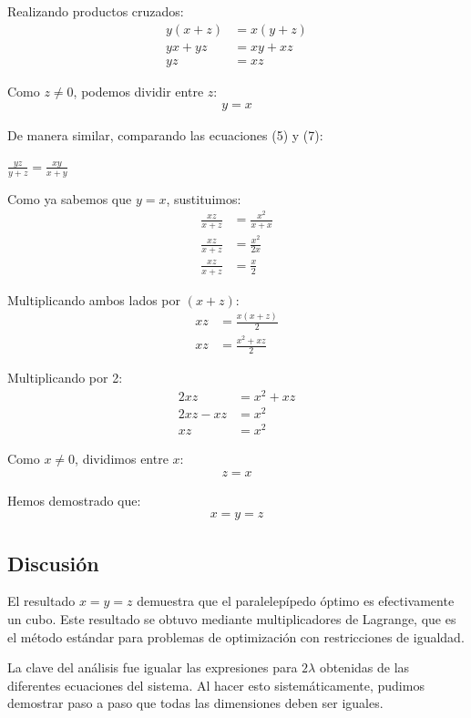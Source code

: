 \documentclass{article}
\begin{document}
Realizando productos cruzados:
\begin{align}
y(x + z) &= x(y + z) \\
yx + yz &= xy + xz \\
yz &= xz
\end{align}

Como $z \neq 0$, podemos dividir entre $z$:
\begin{align}
y = x
\end{align}

De manera similar, comparando las ecuaciones (5) y (7):

$\frac{yz}{y + z} = \frac{xy}{x + y}$

Como ya sabemos que $y = x$, sustituimos:
\begin{align}
\frac{xz}{x + z} &= \frac{x^2}{x + x} \\
\frac{xz}{x + z} &= \frac{x^2}{2x} \\
\frac{xz}{x + z} &= \frac{x}{2}
\end{align}

Multiplicando ambos lados por $(x + z)$:
\begin{align}
xz &= \frac{x(x + z)}{2} \\
xz &= \frac{x^2 + xz}{2}
\end{align}

Multiplicando por 2:
\begin{align}
2xz &= x^2 + xz \\
2xz - xz &= x^2 \\
xz &= x^2
\end{align}

Como $x \neq 0$, dividimos entre $x$:
\begin{align}
z = x
\end{align}

Hemos demostrado que:
\begin{align}
x = y = z
\end{align}

\subsection{Discusión}

El resultado $x = y = z$ demuestra que el paralelepípedo óptimo es efectivamente un cubo. Este resultado se obtuvo mediante multiplicadores de Lagrange, que es el método estándar para problemas de optimización con restricciones de igualdad.

La clave del análisis fue igualar las expresiones para $2\lambda$ obtenidas de las diferentes ecuaciones del sistema. Al hacer esto sistemáticamente, pudimos demostrar paso a paso que todas las dimensiones deben ser iguales.
\end{document}
